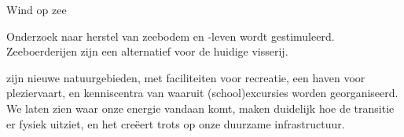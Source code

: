 \begin{voorstel}{Wind op zee}
\begin{multicols}{2}
\begin{aanbevelingen}
Onderzoek naar herstel van zeebodem en -leven wordt gestimuleerd. Zeeboerderijen zijn een alternatief voor de huidige visserij.

 zijn nieuwe natuurgebieden, met faciliteiten voor recreatie, een haven voor pleziervaart, en kenniscentra van waaruit (school)excursies worden georganiseerd.
We laten zien waar onze energie vandaan komt, maken duidelijk hoe de transitie er fysiek uitziet, en het creëert trots op onze duurzame infrastructuur.

\end{aanbevelingen}
\end{multicols}

\end{voorstel}